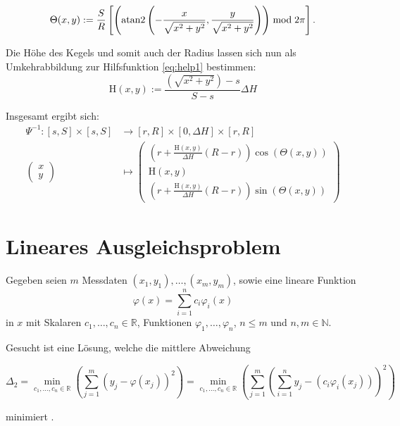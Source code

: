 \begin{equation}\label{eq:help3}
\Theta(x,y) := \frac{S}{R} \left[\left(\text{atan2}\left(-\frac{x}{\sqrt{x^2+y^2}}, \frac{y}{\sqrt{x^2+y^2}}\right)\right) \bmod 2\pi \right].
\end{equation}

Die Höhe des Kegels und somit auch der Radius lassen sich nun als Umkehrabbildung zur Hilfsfunktion \ref{eq:help1} bestimmen:
\begin{equation}\label{eq:help4}
\mathrm{H}(x,y) := \frac{\left(\sqrt{x^2+y^2}\right) - s}{S - s}\Delta H
\end{equation}

Insgesamt ergibt sich:
\begin{equation}\label{eq:LateralToCone}
\begin{aligned}
\Psi^{-1} \colon  [s,S]\times[s,S] &\to [r,R] \times [0, \Delta H] \times [r,R]\\
\begin{pmatrix}
x \\ y
\end{pmatrix} &\mapsto
\begin{pmatrix}
\left( r + \frac{\mathrm{H}(x,y)}{\Delta H} (R - r)\right)\cos\left(\Theta(x,y) \right) \\
\mathrm{H}(x,y)\\
\left( r + \frac{\mathrm{H}(x,y)}{\Delta H} (R - r)\right)\sin\left(\Theta(x,y) \right)
\end{pmatrix}
\end{aligned}
\end{equation}


\section{Lineares Ausgleichsproblem}
\label{s:LSQ}
Gegeben seien $m$ Messdaten $(x_1,y_1),\dotsc,(x_m,y_m)$, sowie eine lineare Funktion
\[
\varphi(x) = \sum_{i = 1}^{n}c_i\varphi_i(x)
\] %
in $x$ mit Skalaren $c_1,\dotsc,c_n\in\mathbb{R}$, Funktionen $\varphi_1,\dotsc,\varphi_n$, $n\leq m$ und $n,m\in\mathbb{N}$.

Gesucht ist eine Lösung, welche die mittlere Abweichung

\[
\Delta_2 = \min_{c_1,\dotsc,c_n\in\mathbb{R}} \left(\sum_{j=1}^{m}\left(y_j - \varphi(x_j)\right)^2\right) = \min_{c_1,\dotsc,c_n\in\mathbb{R}} \left(\sum_{j=1}^{m}\left(\sum_{i=1}^{n}y_j-\left(c_i\varphi_i(x_j)\right)\right)^2\right)
\]

minimiert \cite{Stoer2007}.

